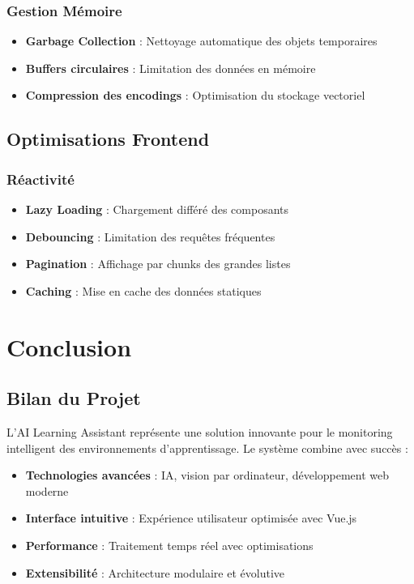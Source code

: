 \documentclass[12pt,a4paper]{article}
\begin{document}
\subsubsection{Gestion Mémoire}
\begin{itemize}
    \item \textbf{Garbage Collection} : Nettoyage automatique des objets temporaires
    \item \textbf{Buffers circulaires} : Limitation des données en mémoire
    \item \textbf{Compression des encodings} : Optimisation du stockage vectoriel
\end{itemize}

\subsection{Optimisations Frontend}

\subsubsection{Réactivité}
\begin{itemize}
    \item \textbf{Lazy Loading} : Chargement différé des composants
    \item \textbf{Debouncing} : Limitation des requêtes fréquentes
    \item \textbf{Pagination} : Affichage par chunks des grandes listes
    \item \textbf{Caching} : Mise en cache des données statiques
\end{itemize}

\section{Conclusion}

\subsection{Bilan du Projet}

L'AI Learning Assistant représente une solution innovante pour le monitoring intelligent des environnements d'apprentissage. Le système combine avec succès :

\begin{itemize}
    \item \textbf{Technologies avancées} : IA, vision par ordinateur, développement web moderne
    \item \textbf{Interface intuitive} : Expérience utilisateur optimisée avec Vue.js
    \item \textbf{Performance} : Traitement temps réel avec optimisations
    \item \textbf{Extensibilité} : Architecture modulaire et évolutive
\end{itemize}
\end{document}
